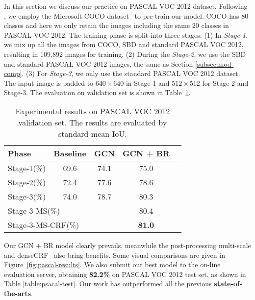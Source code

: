 \documentclass[10pt,twocolumn,letterpaper]{article}
\begin{document}
\label{sec:pascal-voc-2012}
   In this section we discuss our practice on PASCAL VOC 2012 dataset. Following \cite{chen14semantic,zheng2015conditional,liu2015semantic,chen2016deeplab}, we employ the Microsoft COCO dataset~\cite{lin2014microsoft} to pre-train our model. COCO has 80 classes and here we only retain the images including the same 20 classes in PASCAL VOC 2012. The training phase is split into three stages: (1) In \emph{Stage-1}, we mix up all the images from COCO, SBD and standard PASCAL VOC 2012, resulting in 109,892 images for training. (2) During the \emph{Stage-2}, we use the SBD and standard PASCAL VOC 2012 images, the same as Section \ref{subsec:mod-comp}. (3) For \emph{Stage-3}, we only use the standard PASCAL VOC 2012 dataset. The input image is padded to $640\times 640$ in Stage-1 and $512\times 512$ for Stage-2 and Stage-3. The evaluation on validation set is shown in Table~\ref{table:psacal-val}. 
   \begin{table}[h]
      \begin{center}
         \begin{tabular}{|l|c|c|c|c|}
            \hline
            Phase  & Baseline & GCN & GCN + BR \\
            \hline
            Stage-1(\%) & 69.6 & 74.1 & 75.0\\
            \hline
            Stage-2(\%) & 72.4 & 77.6 & 78.6\\
            \hline 
            Stage-3(\%) & 74.0 & 78.7 & 80.3\\
            \hline
            \hline 
            \multicolumn{3}{|l|}{Stage-3-MS(\%)} & 80.4\\
            \hline
            \multicolumn{3}{|l|}{Stage-3-MS-CRF(\%)} & \textbf{81.0}\\
            \hline
         \end{tabular}
      \end{center}
      \caption{Experimental results on PASCAL VOC 2012 validation set. The results are evaluated by standard mean IoU.}
      \label{table:psacal-val}
   \end{table}
\par
   Our GCN + BR model clearly prevails, meanwhile the post-processing multi-scale and denseCRF~\cite{koltun2011efficient} also bring benefits. Some visual comparisons are given in Figure~\ref{fig:pascal-results}. We also submit our best model to the on-line evaluation server, obtaining \textbf{82.2\%} on PASCAL VOC 2012 test set, as shown in Table \ref{table:psacal-test}. Our work has outperformed all the previous \textbf{state-of-the-arts}.
\end{document}
